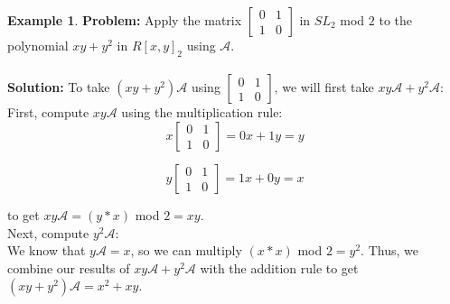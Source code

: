 \documentclass[a4paper,draft]{amsproc}
\theoremstyle{plain}
\theoremstyle{definition}
\newtheorem{exm}{Example}[section]
\theoremstyle{remark}
\numberwithin{equation}{section}
\begin{document}
\begin{exm}
\textbf{Problem:} 
Apply the matrix 
$\begin{bmatrix}
 0&1 \\ 
 1&0 
\end{bmatrix}$ in $SL_{2}$ mod $2$ to the polynomial $xy + y^{2}$ in $R[x,y]_{2}$ using $\mathcal{A}.$ \\ \\
\textbf{Solution:} 
To take $(xy + y^{2})\mathcal{A}$ using $\begin{bmatrix}
 0&1 \\ 
 1&0 
\end{bmatrix}$, we will first take $xy\mathcal{A} + y^{2}\mathcal{A}:$ 
First, compute $xy\mathcal{A}$ using the multiplication rule: \\
$$x\begin{bmatrix}
 0&1 \\ 
 1&0 
\end{bmatrix} = 0x + 1y = y$$

$$y\begin{bmatrix}
 0&1 \\ 
 1&0 
\end{bmatrix} = 1x + 0y = x$$

to get  $xy\mathcal{A} = (y*x)$ mod $2 = xy$. \\

Next, compute $y^{2}\mathcal{A}$: \\
We know that $y\mathcal{A} = x$, so we can multiply $(x*x)$ mod $2 = y^{2}$. 
Thus, we combine our results of $xy\mathcal{A} + y^{2}\mathcal{A}$ with the addition rule to get $(xy + y^{2})\mathcal{A} = x^{2} + xy$. 

\end{exm}
\end{document}
